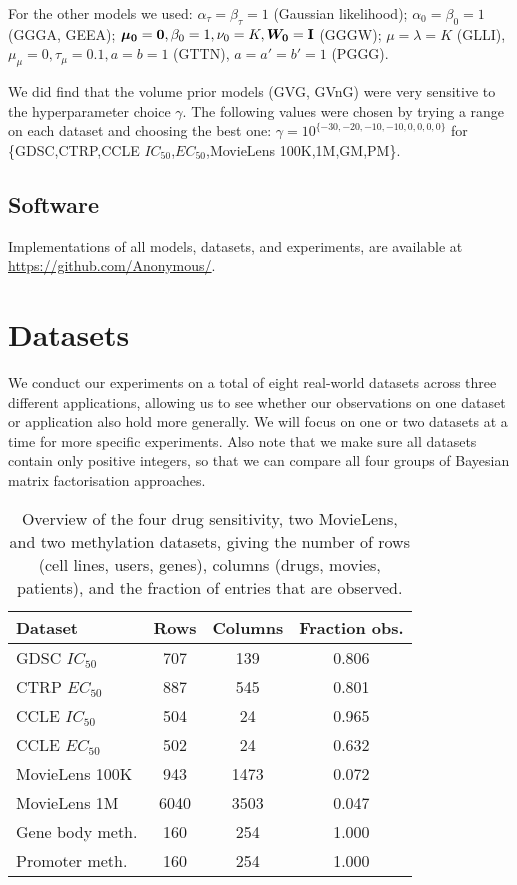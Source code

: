 \documentclass[letterpaper]{article} %
\begin{document}
		For the other models we used:
		$\alpha_{\tau} = \beta_{\tau} = 1 $ (Gaussian likelihood);
		$\alpha_0 = \beta_0 = 1 $ (GGGA, GEEA);
		$\boldsymbol{\mu_0} = \boldsymbol{0}, \beta_0 = 1, \nu_0 = K, \boldsymbol{W_0} = \text{\textbf{I}} $ (GGGW);
		$\mu = \lambda = K $ (GLLI),
		$ \mu_{\mu} = 0, \tau_{\mu} = 0.1, a = b = 1 $ (GTTN),
		$a = a' = b' = 1$ (PGGG).
		
		We did find that the volume prior models (GVG, GVnG) were very sensitive to the hyperparameter choice $\gamma$. The following values were chosen by trying a range on each dataset and choosing the best one: $ \gamma = 10^{\lbrace-30,-20,-10,-10,0,0,0,0\rbrace}$ for \{GDSC,CTRP,CCLE $IC_{50}$,$EC_{50}$,MovieLens 100K,1M,GM,PM\}.

	\subsection{Software}
		Implementations of all models, datasets, and experiments, are available at \url{https://github.com/Anonymous/}.
	
	
\section{Datasets}
	We conduct our experiments on a total of eight real-world datasets across three different applications, allowing us to see whether our observations on one dataset or application also hold more generally. We will focus on one or two datasets at a time for more specific experiments. Also note that we make sure all datasets contain only positive integers, so that we can compare all four groups of Bayesian matrix factorisation approaches. 
	
	\begin{table}[t]
		\caption{Overview of the four drug sensitivity, two MovieLens, and two methylation datasets, giving the number of rows (cell lines, users, genes), columns (drugs, movies, patients), and the fraction of entries that are observed.} \label{summary_datasets}
		\centering
		\begin{tabular}{lccc}
			\toprule
			Dataset & Rows & Columns & Fraction obs. \\
			\midrule
			GDSC $IC_{50}$ & 707 & 139 & 0.806 \\
			CTRP $EC_{50}$ & 887 &  545 & 0.801 \\
			CCLE $IC_{50}$ & 504 & 24 & 0.965 \\
			CCLE $EC_{50}$ & 502 & 24 & 0.632 \\
			MovieLens 100K & 943 & 1473 & 0.072 \\
			MovieLens 1M & 6040 & 3503 & 0.047 \\
			Gene body meth. & 160 & 254 & 1.000 \\
			Promoter meth. & 160 & 254 & 1.000 \\
			\bottomrule
		\end{tabular}
	\end{table}
	
\end{document}
